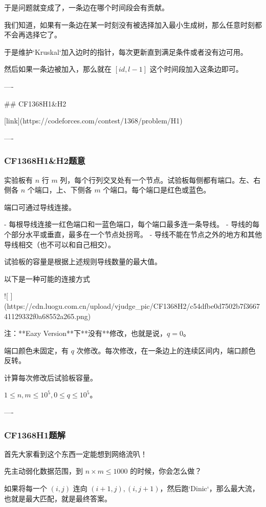 \documentclass[a4paper,12pt]{article}
\begin{document}
于是问题就变成了，一条边在哪个时间段会有贡献。

我们知道，如果有一条边在某一时刻没有被选择加入最小生成树，那么任意时刻都不会再选择它了。

于是维护`Kruskal`加入边时的指针，每次更新直到满足条件或者没有边可用。

然后如果一条边被加入，那么就在 $[id,l - 1]$ 这个时间段加入这条边即可。

----

## CF1368H1&H2

[link](https://codeforces.com/contest/1368/problem/H1)

----

\subsubsection*{CF1368H1&H2题意}

实验板有 $n$ 行 $m$ 列，每个行列交叉处有一个节点。试验板每侧都有端口。左、右侧各 $n$ 个端口，上、下侧各 $m$ 个端口。每个端口是红色或蓝色。

端口可通过导线连接。

- 每根导线连接一红色端口和一蓝色端口，每个端口最多连一条导线。
- 导线的每个部分水平或垂直，最多在一个节点处拐弯。
- 导线不能在节点之外的地方和其他导线相交（也不可以和自己相交）。

试验板的容量是根据上述规则导线数量的最大值。

以下是一种可能的连接方式

![ ](https://cdn.luogu.com.cn/upload/vjudge_pic/CF1368H2/c54dfbe0d7502b7f366741129332f0a68552a265.png)

注：**Eazy Version**下**没有**修改，也就是说，$q=0$。

端口颜色未固定，有 $q$ 次修改。每次修改，在一条边上的连续区间内，端口颜色反转。

计算每次修改后试验板容量。

$1\le n,m \le 10^5, 0 \le q \le 10^5$。

----

\subsubsection*{CF1368H1题解}

首先大家看到这个东西一定能想到网络流叭！

先主动弱化数据范围，到 $n\times m\le1000$ 的时候，你会怎么做？

如果将每一个 $(i,j)$ 连向 $(i+1,j),(i,j+1)$，然后跑`Dinic`，那么最大流，也就是最大匹配，就是最终答案。
\end{document}
